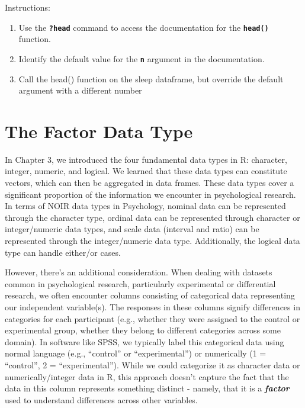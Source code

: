 \documentclass[
]{book}
\begin{document}
\begin{enumerate}
  Instructions:

  \begin{enumerate}
  \def\labelenumii{\arabic{enumii}.}
  \item
    Use the \textbf{\texttt{?head}} command to access the documentation for the \textbf{\texttt{head()}} function.
  \item
    Identify the default value for the \textbf{\texttt{n}} argument in the documentation.
  \item
    Call the head() function on the sleep dataframe, but override the default argument with a different number
  \end{enumerate}
\end{enumerate}

\hypertarget{the-factor-data-type}{%
\section{The Factor Data Type}\label{the-factor-data-type}}

In Chapter 3, we introduced the four fundamental data types in R: character, integer, numeric, and logical. We learned that these data types can constitute vectors, which can then be aggregated in data frames. These data types cover a significant proportion of the information we encounter in psychological research. In terms of NOIR data types in Psychology, nominal data can be represented through the character type, ordinal data can be represented through character or integer/numeric data types, and scale data (interval and ratio) can be represented through the integer/numeric data type. Additionally, the logical data type can handle either/or cases.

However, there's an additional consideration. When dealing with datasets common in psychological research, particularly experimental or differential research, we often encounter columns consisting of categorical data representing our independent variable(s). The responses in these columns signify differences in categories for each participant (e.g., whether they were assigned to the control or experimental group, whether they belong to different categories across some domain). In software like SPSS, we typically label this categorical data using normal language (e.g., ``control'' or ``experimental'') or numerically (1 = ``control'', 2 = ``experimental''). While we could categorize it as character data or numerically/integer data in R, this approach doesn't capture the fact that the data in this column represents something distinct - namely, that it is a \textbf{\emph{factor}} used to understand differences across other variables.
\end{document}
